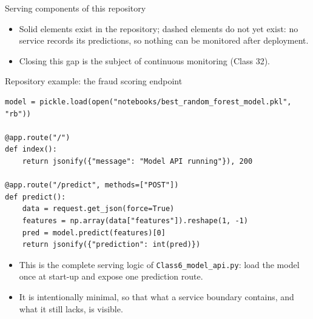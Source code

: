 \begin{frame}{Serving components of this repository}
\centering
{}
\vspace{0.6em}
\begin{itemize}\footnotesize
\item Solid elements exist in the repository; dashed elements do not yet exist: no service records its predictions, so nothing can be monitored after deployment.
\item Closing this gap is the subject of continuous monitoring (Class 32).
\end{itemize}
\coursefooter
\end{frame}

\begin{frame}[fragile]{Repository example: the fraud scoring endpoint}
\begin{lstlisting}[style=coursepython]
model = pickle.load(open("notebooks/best_random_forest_model.pkl", "rb"))

@app.route("/")
def index():
    return jsonify({"message": "Model API running"}), 200

@app.route("/predict", methods=["POST"])
def predict():
    data = request.get_json(force=True)
    features = np.array(data["features"]).reshape(1, -1)
    pred = model.predict(features)[0]
    return jsonify({"prediction": int(pred)})
\end{lstlisting}
\begin{itemize}
\item This is the complete serving logic of \texttt{Class6\_model\_api.py}: load the model once at start-up and expose one prediction route.
\item It is intentionally minimal, so that what a service boundary contains, and what it still lacks, is visible.
\end{itemize}
\coursefooter
\end{frame}

